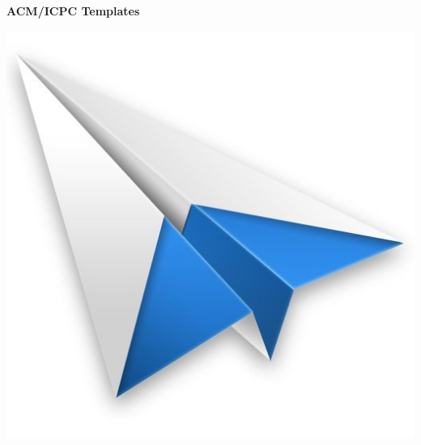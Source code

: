 \begin{titlepage}
  \vspace*{2.5cm}
  \begin{center}
    \centerline{\fontsize{35pt}{\baselineskip}\selectfont\textbf{ACM/ICPC Templates}}
    \vspace{2.0cm}
    \includegraphics[scale=0.7]{cover.jpg}
    \vspace{2.5cm}
  \end{center}
\end{titlepage}

\newpage
\thispagestyle{empty}
